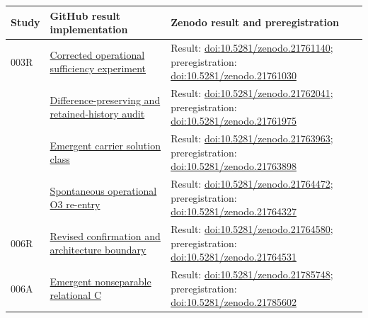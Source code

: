 \documentclass[11pt,a4paper]{article}
\begin{document}
\begin{longtable}{@{}>{\raggedright\arraybackslash}p{1.2cm}>{\raggedright\arraybackslash}p{5.0cm}>{\raggedright\arraybackslash}p{7.8cm}@{}}
\toprule
Study & GitHub result implementation & Zenodo result and preregistration \\
\midrule
\endhead
003R & \href{https://github.com/SIEL-Research/Subjectivity-Intersection-Mathematics/tree/main/experiments/003r_subjectivity_agent_class2_o3_corrected}{Corrected operational sufficiency experiment} & Result: \href{https://doi.org/10.5281/zenodo.21761140}{doi:10.5281/zenodo.21761140}; preregistration: \href{https://doi.org/10.5281/zenodo.21761030}{doi:10.5281/zenodo.21761030} \\
004 & \href{https://github.com/SIEL-Research/Subjectivity-Intersection-Mathematics/tree/main/experiments/004_difference_preserving_o3_discrimination}{Difference-preserving and retained-history audit} & Result: \href{https://doi.org/10.5281/zenodo.21762041}{doi:10.5281/zenodo.21762041}; preregistration: \href{https://doi.org/10.5281/zenodo.21761975}{doi:10.5281/zenodo.21761975} \\
005 & \href{https://github.com/SIEL-Research/Subjectivity-Intersection-Mathematics/tree/main/experiments/005_emergent_relational_carrier_solution_class}{Emergent carrier solution class} & Result: \href{https://doi.org/10.5281/zenodo.21763963}{doi:10.5281/zenodo.21763963}; preregistration: \href{https://doi.org/10.5281/zenodo.21763898}{doi:10.5281/zenodo.21763898} \\
006 & \href{https://github.com/SIEL-Research/Subjectivity-Intersection-Mathematics/tree/main/experiments/006_spontaneous_o3_reentry}{Spontaneous operational O3 re-entry} & Result: \href{https://doi.org/10.5281/zenodo.21764472}{doi:10.5281/zenodo.21764472}; preregistration: \href{https://doi.org/10.5281/zenodo.21764327}{doi:10.5281/zenodo.21764327} \\
006R & \href{https://github.com/SIEL-Research/Subjectivity-Intersection-Mathematics/tree/main/experiments/006r_spontaneous_o3_reentry_revised}{Revised confirmation and architecture boundary} & Result: \href{https://doi.org/10.5281/zenodo.21764580}{doi:10.5281/zenodo.21764580}; preregistration: \href{https://doi.org/10.5281/zenodo.21764531}{doi:10.5281/zenodo.21764531} \\
006A & \href{https://github.com/SIEL-Research/Subjectivity-Intersection-Mathematics/tree/main/experiments/006a_emergent_nonseparable_relational_c}{Emergent nonseparable relational C} & Result: \href{https://doi.org/10.5281/zenodo.21785748}{doi:10.5281/zenodo.21785748}; preregistration: \href{https://doi.org/10.5281/zenodo.21785602}{doi:10.5281/zenodo.21785602} \\

\end{longtable}
\end{document}
